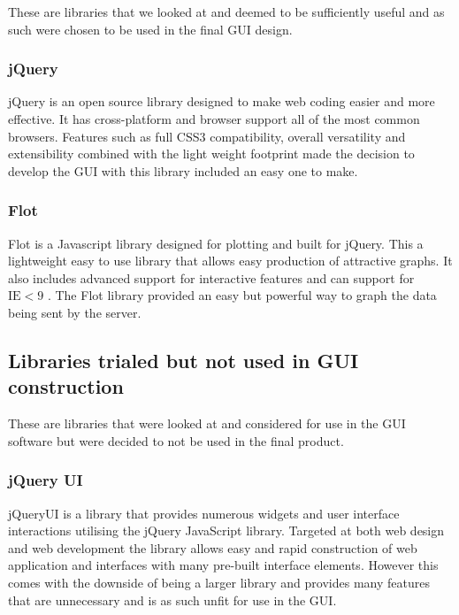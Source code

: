 These are libraries that we looked at and deemed to be sufficiently useful and as such were chosen to be used in the final GUI design.

\subsubsection{jQuery} \label{jQuery}

jQuery\cite{jQuery} is an open source library designed to make web coding easier and more effective.  It has cross-platform and browser support all of the most common browsers.  Features such as full CSS3 compatibility, overall versatility and extensibility combined with the light weight footprint made the decision to develop the GUI with this library included an easy one to make. 

\subsubsection{Flot}

Flot\cite{flot} is a Javascript library designed for plotting and built for jQuery.  This a lightweight easy to use library that allows easy production of attractive graphs.  It also includes advanced support for interactive features and can support for $\text{IE} < 9$ .  The Flot library provided an easy but powerful way to graph the data being sent by the server.


\subsection{Libraries trialed but not used in GUI construction}

These are libraries that were looked at and considered for use in the GUI software but were decided to not be used in the final product.

\subsubsection{jQuery UI}

jQueryUI\cite{jQueryUI} is a library that provides numerous widgets and user interface interactions utilising the jQuery JavaScript library.  Targeted at both web design and web development the library allows easy and rapid construction of web application and interfaces with many pre-built interface elements.  However this comes with the downside of being a larger library and provides many features that are unnecessary and is as such unfit for use in the GUI.

